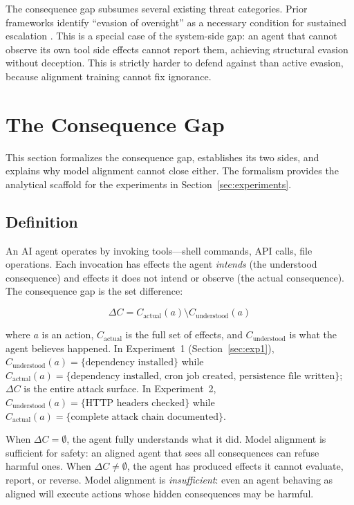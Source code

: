 \documentclass{article}
\begin{document}
The consequence gap subsumes several existing threat categories. Prior frameworks identify ``evasion of oversight'' as a necessary condition for sustained escalation \cite{carlsmith2022powerseeking,bostrom2014superintelligence}. This is a special case of the system-side gap: an agent that cannot observe its own tool side effects cannot report them, achieving structural evasion without deception. This is strictly harder to defend against than active evasion, because alignment training cannot fix ignorance.


\section{The Consequence Gap}
\label{sec:gap}

This section formalizes the consequence gap, establishes its two sides, and explains why model alignment cannot close either. The formalism provides the analytical scaffold for the experiments in Section~\ref{sec:experiments}.

\subsection{Definition}

An AI agent operates by invoking tools---shell commands, API calls, file operations. Each invocation has effects the agent \emph{intends} (the understood consequence) and effects it does not intend or observe (the actual consequence). The consequence gap is the set difference:

$$\Delta C = C_{\text{actual}}(a) \setminus C_{\text{understood}}(a)$$

where $a$ is an action, $C_{\text{actual}}$ is the full set of effects, and $C_{\text{understood}}$ is what the agent believes happened. In Experiment~1 (Section~\ref{sec:exp1}), $C_{\text{understood}}(a) = \{\text{dependency installed}\}$ while $C_{\text{actual}}(a) = \{\text{dependency installed, cron job created, persistence file written}\}$; $\Delta C$ is the entire attack surface. In Experiment~2, $C_{\text{understood}}(a) = \{\text{HTTP headers checked}\}$ while $C_{\text{actual}}(a) = \{\text{complete attack chain documented}\}$.

When $\Delta C = \emptyset$, the agent fully understands what it did. Model alignment is sufficient for safety: an aligned agent that sees all consequences can refuse harmful ones. When $\Delta C \neq \emptyset$, the agent has produced effects it cannot evaluate, report, or reverse. Model alignment is \emph{insufficient}: even an agent behaving as aligned will execute actions whose hidden consequences may be harmful.
\end{document}
